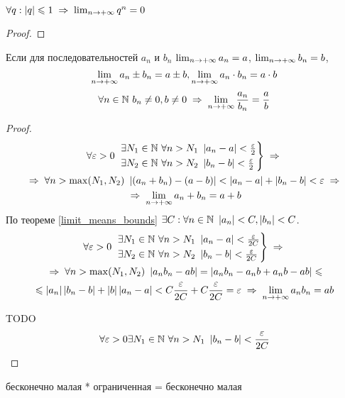 \begin{theorem}
    $\forall q : \abs{q} \le 1 \thus \limpinf{q^n} = 0$
\end{theorem}
\begin{proof}
\end{proof}


\begin{theorem}
    Если для последовательностей $a_n$ и $b_n$ $\lim_{n\to+\infty} a_n = a$, $\lim_{n\to+\infty} b_n = b$,
    \[ \lim_{n\to+\infty} a_n \pm b_n = a \pm b, \lim_{n\to+\infty} a_n \cdot b_n = a \cdot b \]
    \[ \forall n \in \N\ b_n \ne 0, b \ne 0 \thus \limpinf \frac{a_n}{b_n} = \frac{a}{b} \]
\end{theorem}
\begin{proof}
    \begin{multline*}
        \forall \varepsilon > 0\ 
        \begin{rcases}
            \exists N_1 \in \N\ \forall n > N_1\ \abs{a_n - a} < \frac{\varepsilon}{2} \\
            \exists N_2 \in \N\ \forall n > N_2\ \abs{b_n - b} < \frac{\varepsilon}{2}
        \end{rcases} \thus \\
        \thus \forall n > \max(N_1, N_2)\ \abs{(a_n + b_n) - (a - b)} <
        \abs{a_n - a} + \abs{b_n - b} < \varepsilon \thus \\
        \thus \limpinf{a_n + b_n} = a + b
    \end{multline*}
    По теореме \ref{limit_means_bounds} $\exists C : \forall n\in\mathbb{N}\ \left\lvert a_n \right\rvert < C, \left\lvert b_n \right\rvert < C$.
    \begin{multline*}
        \forall \varepsilon > 0\ 
        \begin{rcases}
            \exists N_1 \in \N\ \forall n > N_1\ \abs{a_n - a} < \frac{\varepsilon}{2C} \\
            \exists N_2 \in \N\ \forall n > N_2\ \abs{b_n - b} < \frac{\varepsilon}{2C}
        \end{rcases} \thus \\
        \thus \forall n > \max(N_1, N_2)\ \abs{a_n b_n - ab} = \abs{a_n b_n - a_n b + a_n b - ab} \le \\
        \le \abs{a_n} \abs{b_n - b} + \abs{b} \abs{a_n - a} <
        C \frac{\varepsilon}{2C} + C \frac{\varepsilon}{2C} = \varepsilon \thus
        \limpinf{a_n b_n} = a b
    \end{multline*}

    TODO %
    \begin{multline*}
        \forall \varepsilon > 0 \exists N_1 \in \mathbb{N}\ \forall n > N_1\ \left\lvert b_n - b \right\rvert < \frac{\varepsilon}{2C} \\
    \end{multline*}
     
\end{proof}

\begin{theorem}
    бесконечно малая * ограниченная = бесконечно малая
\end{theorem}
